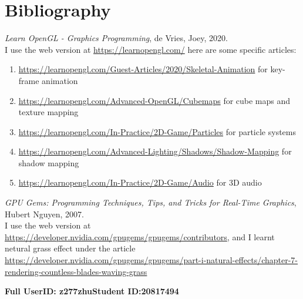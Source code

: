\documentclass {article}
\begin{document}
\section{Bibliography}
    \textit{Learn OpenGL - Graphics Programming}, de Vries, Joey, 2020. \\
    I use the web version at \url{https://learnopengl.com/} here are some specific articles:
    \begin{enumerate}
        \item \url{https://learnopengl.com/Guest-Articles/2020/Skeletal-Animation} for key-frame animation
        \item \url{https://learnopengl.com/Advanced-OpenGL/Cubemaps} for cube maps and texture mapping
        \item \url{https://learnopengl.com/In-Practice/2D-Game/Particles} for particle systems
        \item \url{https://learnopengl.com/Advanced-Lighting/Shadows/Shadow-Mapping} for shadow mapping
        \item \url{https://learnopengl.com/In-Practice/2D-Game/Audio} for 3D audio
    \end{enumerate}
    \textit{ GPU Gems: Programming Techniques, Tips, and Tricks for Real-Time Graphics}, Hubert Nguyen, 2007. \\
    I use the web version at \url{https://developer.nvidia.com/gpugems/gpugems/contributors}, and I learnt netural grass
    effect under the article \url{https://developer.nvidia.com/gpugems/gpugems/part-i-natural-effects/chapter-7-rendering-countless-blades-waving-grass}

\newpage



{\hfill{\bf Full UserID: z277zhu}\hfill{\bf Student ID:20817494}\hfill}
\end{document}

